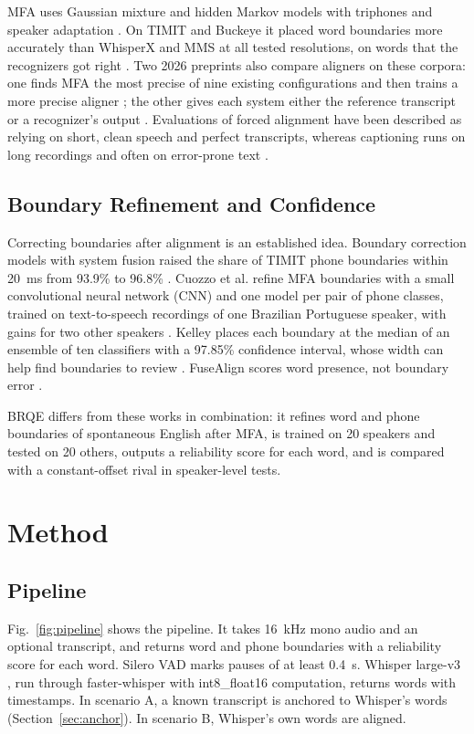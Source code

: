 \documentclass[conference,a4paper]{IEEEtran}
\begin{document}
MFA uses Gaussian mixture and hidden Markov models with triphones and speaker adaptation \cite{McAuliffe2017}. On TIMIT and Buckeye it placed word boundaries more accurately than WhisperX and MMS at all tested resolutions, on words that the recognizers got right \cite{Rousso2024}. Two 2026 preprints also compare aligners on these corpora: one finds MFA the most precise of nine existing configurations and then trains a more precise aligner \cite{Zolkepli2026}; the other gives each system either the reference transcript or a recognizer's output \cite{Chu2026FABench}. Evaluations of forced alignment have been described as relying on short, clean speech and perfect transcripts, whereas captioning runs on long recordings and often on error-prone text \cite{Vaidya2026}.

\subsection{Boundary Refinement and Confidence}
Correcting boundaries after alignment is an established idea. Boundary correction models with system fusion raised the share of TIMIT phone boundaries within 20~ms from 93.9\% to 96.8\% \cite{Stolcke2014}. Cuozzo et al. refine MFA boundaries with a small convolutional neural network (CNN) and one model per pair of phone classes, trained on text-to-speech recordings of one Brazilian Portuguese speaker, with gains for two other speakers \cite{Cuozzo2018}. Kelley places each boundary at the median of an ensemble of ten classifiers with a 97.85\% confidence interval, whose width can help find boundaries to review \cite{Kelley2026}. FuseAlign scores word presence, not boundary error \cite{Vaidya2026}.

BRQE differs from these works in combination: it refines word and phone boundaries of spontaneous English after MFA, is trained on 20 speakers and tested on 20 others, outputs a reliability score for each word, and is compared with a constant-offset rival in speaker-level tests.

\section{Method}
\subsection{Pipeline}
Fig.~\ref{fig:pipeline} shows the pipeline. It takes 16~kHz mono audio and an optional transcript, and returns word and phone boundaries with a reliability score for each word. Silero VAD \cite{SileroVAD} marks pauses of at least 0.4~s. Whisper large-v3 \cite{Radford2023}, run through faster-whisper \cite{FasterWhisper} with int8\_float16 computation, returns words with timestamps. In scenario A, a known transcript is anchored to Whisper's words (Section~\ref{sec:anchor}). In scenario B, Whisper's own words are aligned.
\end{document}
